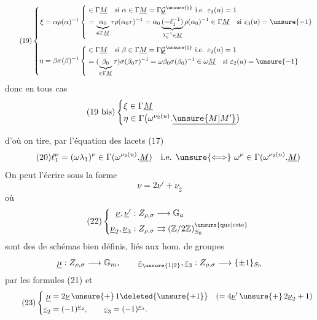\[
\tag{19}
\left\{
\begin{aligned}
\xi=\alpha\rho(\alpha)^{-1}
&\left\{
\begin{aligned}
&\in\Gamma\underline M\quad\text{si }\alpha\in\Gamma\underline M=\Gamma\underline{\mathcal G}^{\unsure{\natural}}\ \text{i.e. }\varepsilon_3(u)=1\\
&=\underbrace{\alpha_0}_{\in\Gamma\underline M}\tau\rho(\alpha_0\tau)^{-1}
=\alpha_0\underbrace{(-\ell_1^{-1})}_{\lambda_1^{-1}\in\underline M}\rho(\alpha_0)^{-1}\in\Gamma\underline M\quad\text{si }\varepsilon_3(u)=\unsure{-1}
\end{aligned}\right.\\[1ex]
\eta=\beta\sigma(\beta)^{-1}
&\left\{
\begin{aligned}
&\in\Gamma\underline M\quad\text{si }\beta\in\Gamma\underline M=\Gamma\underline{\mathcal G}^{\unsure{\natural}}\ \text{i.e. }\varepsilon_2(u)=1\\
&=(\underbrace{\beta_0}_{\in\Gamma\underline M}\tau)\sigma(\beta_0\tau)^{-1}
=\omega\beta_0\sigma(\beta_0)^{-1}\in\omega\underline M\quad\text{si }\varepsilon_2(u)=\unsure{-1}
\end{aligned}\right.
\end{aligned}\right.
\]
donc en tous cas
\[
\tag{19 bis}
\begin{cases}
\xi\in\Gamma\underline M\\
\eta\in\Gamma\bigl(\omega^{\nu_2(u)}.\underline{\unsure{M|M'}}\bigr)
\end{cases}
\]


d'où on tire, par l'équation des lacets (17)
\[
\tag{20}
\ell_1^{\nu}=(\omega\lambda_1)^{\nu}\in\Gamma(\omega^{\nu_2(u)}.\underline M)
\quad\text{i.e. }\unsure{\Longleftrightarrow}\ \omega^{\nu}\in\Gamma(\omega^{\nu_2(u)}.\underline M)
\]
On peut l'écrire sous la forme
\[
\tag{21}
\underline\nu=2\underline\nu'+\underline\nu_2
\]
où
\[
\tag{22}
\left\{
\begin{aligned}
\underline\nu,\underline\nu' &: Z_{\rho,\sigma}\longrightarrow\mathbb G_a\\
\underline\nu_2,\underline\nu_3 &: Z_{\rho,\sigma}\rightrightarrows
(\mathbb Z/2\mathbb Z)_{S_0}^{\unsure{\mathrm{que}|\mathrm{cste}}}
\end{aligned}\right.
\]
\deleted{$\unsure{\varepsilon}$}
sont des  de schémas bien définis, liés  aux hom. de groupes \deleted{$\unsure{\mu}$}
\[
\underline\mu:Z_{\rho,\sigma}\longrightarrow\mathbb G_m,\qquad
\underline\varepsilon_{\unsure{1|2}},\underline\varepsilon_3:Z_{\rho,\sigma}\longrightarrow\{\pm1\}_{S_0}
\]
par les formules (21) et
\[
\tag{23}
\left\{
\begin{aligned}
\underline\mu&=2\underline\nu\,\unsure{+}\,1\deleted{\unsure{+1}}
\quad(=4\underline\nu'\,\unsure{+}\,2\underline\nu_2+1)\\
\underline\varepsilon_2&=(-1)^{\underline\nu_2},\qquad
\underline\varepsilon_3=(-1)^{\underline\nu_3}.
\end{aligned}\right.
\]

